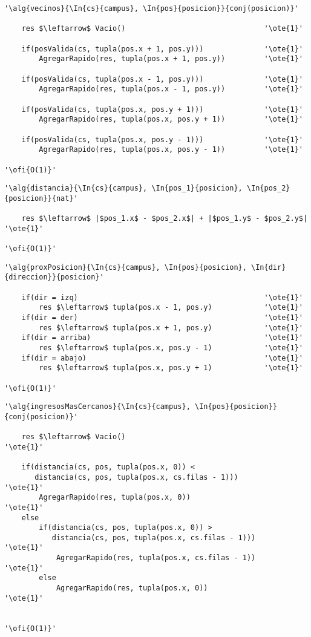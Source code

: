 \begin{lstlisting}[mathescape]
'\alg{vecinos}{\In{cs}{campus}, \In{pos}{posicion}}{conj(posicion)}'

	res $\leftarrow$ Vacio() 								'\ote{1}'

	if(posValida(cs, tupla(pos.x + 1, pos.y))) 				'\ote{1}'
		AgregarRapido(res, tupla(pos.x + 1, pos.y))			'\ote{1}'	

	if(posValida(cs, tupla(pos.x - 1, pos.y))) 				'\ote{1}'
		AgregarRapido(res, tupla(pos.x - 1, pos.y))			'\ote{1}'	

	if(posValida(cs, tupla(pos.x, pos.y + 1))) 				'\ote{1}'
		AgregarRapido(res, tupla(pos.x, pos.y + 1))			'\ote{1}'

	if(posValida(cs, tupla(pos.x, pos.y - 1)))				'\ote{1}'
		AgregarRapido(res, tupla(pos.x, pos.y - 1))			'\ote{1}'

'\ofi{O(1)}'
\end{lstlisting}

\begin{lstlisting}[mathescape]
'\alg{distancia}{\In{cs}{campus}, \In{pos_1}{posicion}, \In{pos_2}{posicion}}{nat}'
	
	res $\leftarrow$ |$pos_1.x$ - $pos_2.x$| + |$pos_1.y$ - $pos_2.y$|	'\ote{1}'

'\ofi{O(1)}'
\end{lstlisting}

\begin{lstlisting}[mathescape]
'\alg{proxPosicion}{\In{cs}{campus}, \In{pos}{posicion}, \In{dir}{direccion}}{posicion}'

	if(dir = izq)											'\ote{1}'
		res $\leftarrow$ tupla(pos.x - 1, pos.y)			'\ote{1}'
	if(dir = der)											'\ote{1}'
		res $\leftarrow$ tupla(pos.x + 1, pos.y)			'\ote{1}'
	if(dir = arriba)										'\ote{1}'
		res $\leftarrow$ tupla(pos.x, pos.y - 1)			'\ote{1}'
	if(dir = abajo)											'\ote{1}'
		res $\leftarrow$ tupla(pos.x, pos.y + 1)			'\ote{1}'

'\ofi{O(1)}'
\end{lstlisting}

\begin{lstlisting}[mathescape]
'\alg{ingresosMasCercanos}{\In{cs}{campus}, \In{pos}{posicion}}{conj(posicion)}'

	res $\leftarrow$ Vacio()										'\ote{1}'

	if(distancia(cs, pos, tupla(pos.x, 0)) < 
	   distancia(cs, pos, tupla(pos.x, cs.filas - 1))) 				'\ote{1}'
		AgregarRapido(res, tupla(pos.x, 0))							'\ote{1}'
	else
		if(distancia(cs, pos, tupla(pos.x, 0)) > 
		   distancia(cs, pos, tupla(pos.x, cs.filas - 1))) 			'\ote{1}'
			AgregarRapido(res, tupla(pos.x, cs.filas - 1))			'\ote{1}'
		else
			AgregarRapido(res, tupla(pos.x, 0))						'\ote{1}'


'\ofi{O(1)}'
\end{lstlisting}